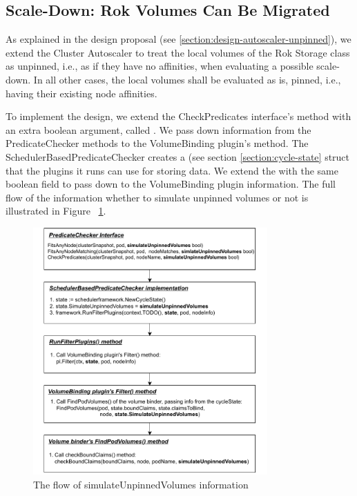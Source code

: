 \subsection{Scale-Down: Rok Volumes Can Be Migrated}
\label{section:implementation-migration}
As explained in the design proposal (see
\ref{section:design-autoscaler-unpinned}), we extend the Cluster Autoscaler to
treat the local volumes of the Rok Storage class as unpinned, i.e., as if they
have no affinities, when evaluating a possible scale-down. In all other cases,
the local volumes shall be evaluated as is, pinned, i.e., having their existing
node affinities. 

To implement the design, we extend the CheckPredicates interface's method with
an extra boolean argument, called . We pass down
information from the PredicateChecker methods to the VolumeBinding plugin's
 method. The SchedulerBasedPredicateChecker creates a
 (see section \ref{section:cycle-state} struct that the plugins
it runs can use for storing data. We extend the   with the same
boolean  field to pass down to the VolumeBinding
plugin information. The full flow of the information whether to simulate
unpinned volumes or not is illustrated in Figure ~\ref{fig:flow-simulate}.

\begin{figure}[ht]
      \centering
      \includegraphics[width=0.8\textwidth]{resources/simulate-unpinned-flow.pdf}
      \caption{The flow of simulateUnpinnedVolumes information}
      \label{fig:flow-simulate}
\end{figure}


